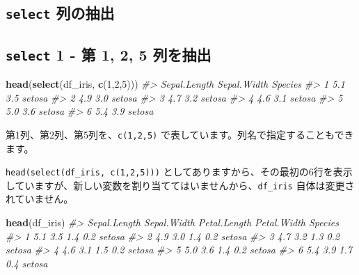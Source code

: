\documentclass[
  xelatex, ja=standard]{bxjsbook}
\newenvironment{Shaded}{\begin{snugshade}}{\end{snugshade}}
\newcommand{\CommentTok}[1]{\textcolor[rgb]{0.56,0.35,0.01}{\textit{#1}}}
\newcommand{\DecValTok}[1]{\textcolor[rgb]{0.00,0.00,0.81}{#1}}
\newcommand{\FunctionTok}[1]{\textcolor[rgb]{0.13,0.29,0.53}{\textbf{#1}}}
\newcommand{\NormalTok}[1]{#1}
\theoremstyle{definition}
\theoremstyle{definition}
\theoremstyle{definition}
\theoremstyle{definition}
\theoremstyle{remark}
\begin{document}
\hypertarget{select-ux5217ux306eux62bdux51fa}{%
\subsection{\texorpdfstring{\texttt{select} 列の抽出}{select 列の抽出}}\label{select-ux5217ux306eux62bdux51fa}}

\hypertarget{select-1---ux7b2c-1-2-5-ux5217ux3092ux62bdux51fa}{%
\subsection{\texorpdfstring{\texttt{select} 1 - 第 1, 2, 5 列を抽出}{select 1 - 第 1, 2, 5 列を抽出}}\label{select-1---ux7b2c-1-2-5-ux5217ux3092ux62bdux51fa}}

\begin{Shaded}
\begin{Highlighting}[]
\FunctionTok{head}\NormalTok{(}\FunctionTok{select}\NormalTok{(df\_iris, }\FunctionTok{c}\NormalTok{(}\DecValTok{1}\NormalTok{,}\DecValTok{2}\NormalTok{,}\DecValTok{5}\NormalTok{)))}
\CommentTok{\#\textgreater{}   Sepal.Length Sepal.Width Species}
\CommentTok{\#\textgreater{} 1          5.1         3.5  setosa}
\CommentTok{\#\textgreater{} 2          4.9         3.0  setosa}
\CommentTok{\#\textgreater{} 3          4.7         3.2  setosa}
\CommentTok{\#\textgreater{} 4          4.6         3.1  setosa}
\CommentTok{\#\textgreater{} 5          5.0         3.6  setosa}
\CommentTok{\#\textgreater{} 6          5.4         3.9  setosa}
\end{Highlighting}
\end{Shaded}

第1列、第2列、第5列を、\texttt{c(1,2,5)} で表しています。列名で指定することもできます。

\texttt{head(select(df\_iris,\ c(1,2,5)))} としてありますから、その最初の6行を表示していますが、新しい変数を割り当ててはいませんから、\texttt{df\_iris} 自体は変更されていません。

\begin{Shaded}
\begin{Highlighting}[]
\FunctionTok{head}\NormalTok{(df\_iris)}
\CommentTok{\#\textgreater{}   Sepal.Length Sepal.Width Petal.Length Petal.Width Species}
\CommentTok{\#\textgreater{} 1          5.1         3.5          1.4         0.2  setosa}
\CommentTok{\#\textgreater{} 2          4.9         3.0          1.4         0.2  setosa}
\CommentTok{\#\textgreater{} 3          4.7         3.2          1.3         0.2  setosa}
\CommentTok{\#\textgreater{} 4          4.6         3.1          1.5         0.2  setosa}
\CommentTok{\#\textgreater{} 5          5.0         3.6          1.4         0.2  setosa}
\CommentTok{\#\textgreater{} 6          5.4         3.9          1.7         0.4  setosa}
\end{Highlighting}
\end{Shaded}
\end{document}
